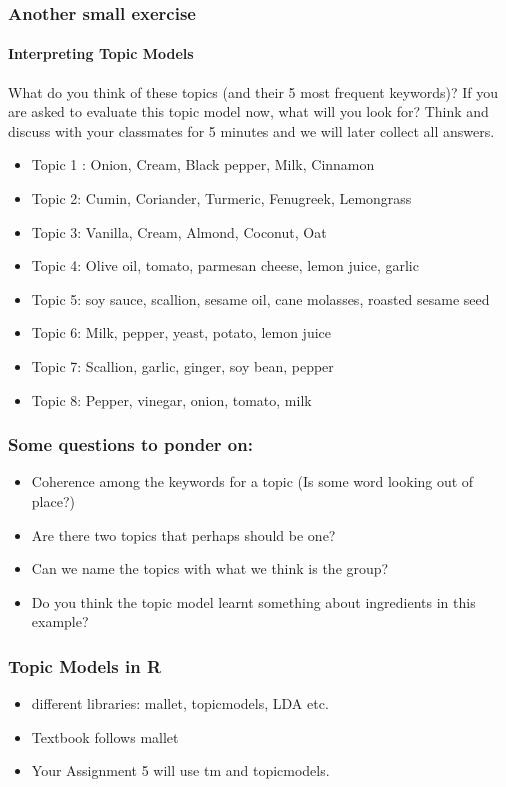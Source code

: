 \documentclass{beamer}
\begin{document}
\begin{frame}
\frametitle{Another small exercise}
\framesubtitle{Interpreting Topic Models}
What do you think of these topics (and their 5 most frequent keywords)? If you are asked to evaluate this topic model now, what will you look for? Think and discuss with your classmates for 5 minutes and we will later collect all answers. \small
\begin{itemize}
\item Topic 1 : Onion, Cream, Black pepper, Milk, Cinnamon
\item Topic 2: Cumin, Coriander, Turmeric, Fenugreek, Lemongrass
\item Topic 3: Vanilla, Cream, Almond, Coconut, Oat
\item Topic 4: Olive oil, tomato, parmesan cheese, lemon juice, garlic
\item Topic 5: soy sauce, scallion, sesame oil, cane molasses, roasted sesame seed
\item Topic 6: Milk, pepper, yeast, potato, lemon juice
\item Topic 7: Scallion, garlic, ginger, soy bean, pepper
\item Topic 8: Pepper, vinegar, onion, tomato, milk
\end{itemize}
\end{frame}

\begin{frame}
\frametitle{Some questions to ponder on:}
\begin{itemize}
\item Coherence among the keywords for a topic (Is some word looking out of place?)
\item Are there two topics that perhaps should be one?
\item Can we name the topics with what we think is the group?
\item Do you think the topic model learnt something about ingredients in this example? 
\end{itemize}
\end{frame}

\begin{frame}
\frametitle{Topic Models in R}
\begin{itemize}
\item different libraries: mallet, topicmodels, LDA etc.
\item Textbook follows mallet
\item Your Assignment 5 will use tm and topicmodels.
\end{itemize}
\end{frame}
\end{document}
